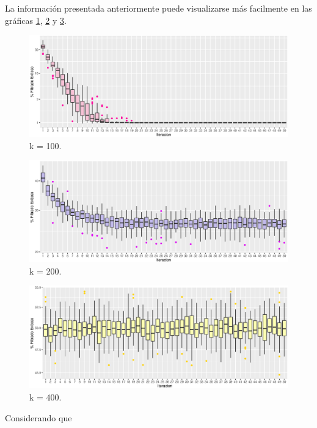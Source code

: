 \documentclass{article}
\begin{document}
La informaci\'on presentada anteriormente puede visualizarse m\'as facilmente en las gr\'aficas \ref{Figura 1}, \ref{Figura 2} y \ref{Figura 3}.

\begin{figure}[ht] %
    \centering
    \includegraphics[width=150mm]{k100.eps} %
    \caption{k = 100.}
    \label{Figura 1}
\end{figure}
\begin{figure}[ht] %
    \centering
    \includegraphics[width=150mm]{k200.eps} %
    \caption{k = 200.}
    \label{Figura 2}
\end{figure}
\begin{figure}[ht] %
    \centering
    \includegraphics[width=150mm]{k400.eps} %
    \caption{k = 400.}
    \label{Figura 3}
\end{figure}


\newpage

Considerando que 
\end{document}
